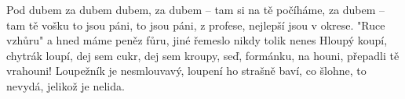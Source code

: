 \begin{TEXT}{Pod dubem za dubem}
\REFREN {} dubem, za dubem -- tam si na tě počíháme, \NL
{} za dubem -- tam tě vošku 
\SLOKA {} to jsou páni, to jsou páni, \NL
{} z profese, nejlepší jsou v okrese. \NL
{} "Ruce vzhůru" a hned máme peněz fůru, \NL
{} jiné řemeslo nikdy tolik nenes
\REFRENHRAJ
\SLOKA Hloupý koupí, chytrák loupí, dej sem cukr, dej sem kroupy,\NL
seď, formánku, na houni, přepadli tě vrahouni! \NL
Loupežník je nesmlouvavý, loupení ho strašně baví, \NL
co šlohne, to nevydá, jelikož je nelida.
\REFRENHRAJ
\end{TEXT}
